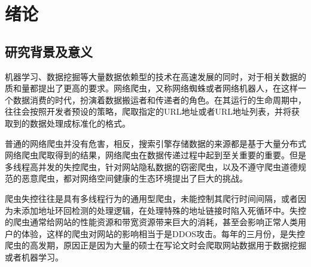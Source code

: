 \documentclass[doctor,privacy,twoside]{buaa_mac}
\begin{document}



\chapter{绪论}


\section{研究背景及意义}
机器学习、数据挖掘等大量数据依赖型的技术在高速发展的同时，对于相关数据的质和量都提出了更高的要求。网络爬虫，又称网络蜘蛛或者网络机器人，在这样一个数据消费的时代，扮演着数据搬运者和传递者的角色。在其运行的生命周期中，往往会按照开发者预设的策略，爬取指定的URL地址或者URL地址列表，并将获取到的数据处理成标准化的格式。

普通的网络爬虫并没有危害，相反，搜索引擎存储数据的来源都是基于大量分布式网络爬虫爬取得到的结果，网络爬虫在数据传递过程中起到至关重要的重要。但是多线程高并发的失控爬虫，针对网站隐私数据的窃密爬虫，以及不遵守爬虫道德规范的恶意爬虫，都对网络空间健康的生态环境提出了巨大的挑战。

爬虫失控往往是具有多线程行为的通用型爬虫，未能控制其爬行时间间隔，或者因为未添加地址环回检测的处理逻辑，在处理特殊的地址链接时陷入死循环中。失控的爬虫通常给网站的性能资源和带宽资源带来巨大的消耗，甚至会影响正常人类用户的体验，这样的爬虫对网站的影响相当于是DDOS攻击。每年的三月份，是失控爬虫的高发期，原因正是因为大量的硕士在写论文时会爬取网站数据用于数据挖掘或者机器学习。
\end{document}
